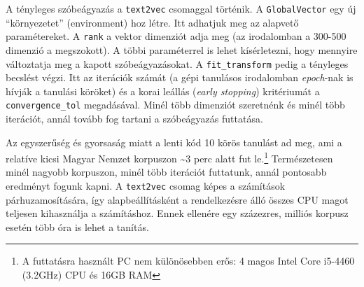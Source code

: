 \documentclass[
]{book}
\newenvironment{Shaded}{\begin{snugshade}}{\end{snugshade}}
\newcommand{\AttributeTok}[1]{\textcolor[rgb]{0.77,0.63,0.00}{#1}}
\newcommand{\CommentTok}[1]{\textcolor[rgb]{0.56,0.35,0.01}{\textit{#1}}}
\newcommand{\DecValTok}[1]{\textcolor[rgb]{0.00,0.00,0.81}{#1}}
\newcommand{\FloatTok}[1]{\textcolor[rgb]{0.00,0.00,0.81}{#1}}
\newcommand{\FunctionTok}[1]{\textcolor[rgb]{0.00,0.00,0.00}{#1}}
\newcommand{\NormalTok}[1]{#1}
\newcommand{\OtherTok}[1]{\textcolor[rgb]{0.56,0.35,0.01}{#1}}
\newcommand{\SpecialCharTok}[1]{\textcolor[rgb]{0.00,0.00,0.00}{#1}}
\begin{document}
A tényleges szóbeágyazás a \texttt{text2vec} csomaggal történik. A
\texttt{GlobalVector} egy új ``környezetet'' (environment) hoz létre.
Itt adhatjuk meg az alapvető paramétereket. A \texttt{rank} a vektor
dimenziót adja meg (az irodalomban a 300-500 dimenzió a megszokott). A
többi paraméterrel is lehet kísérletezni, hogy mennyire változtatja meg
a kapott szóbeágyazásokat. A \texttt{fit\_transform} pedig a tényleges
becslést végzi. Itt az iterációk számát (a gépi tanulásos irodalomban
\emph{epoch}-nak is hívják a tanulási köröket) és a korai leállás
(\emph{early stopping}) kritériumát a \texttt{convergence\_tol}
megadásával. Minél több dimenziót szeretnénk és minél több iterációt,
annál tovább fog tartani a szóbeágyazás futtatása.

Az egyszerűség és gyorsaság miatt a lenti kód 10 körös tanulást ad meg,
ami a relatíve kicsi Magyar Nemzet korpuszon \textasciitilde3 perc alatt
fut le.\footnote{A futtatásra használt PC nem különösebben erős: 4 magos
  Intel Core i5-4460 (3.2GHz) CPU és 16GB RAM} Természetesen minél
nagyobb korpuszon, minél több iterációt futtatunk, annál pontosabb
eredményt fogunk kapni. A \texttt{text2vec} csomag képes a számítások
párhuzamosítására, így alapbeállításként a rendelkezésre álló összes CPU
magot teljesen kihasználja a számításhoz. Ennek ellenére egy százezres,
milliós korpusz esetén több óra is lehet a tanítás.

\begin{Shaded}
\end{Shaded}
\end{document}
